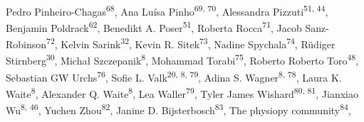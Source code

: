 \documentclass[10pt,a4paper,twocolumns]{proc}
\begin{document}
{Pedro Pinheiro-Chagas\textsuperscript{68}, %
Ana Luísa Pinho\textsuperscript{69, 70}, %
Alessandra Pizzuti\textsuperscript{51, 44}, %
Benjamin Poldrack\textsuperscript{62}, %
Benedikt A. Poser\textsuperscript{51}, %
Roberta Rocca\textsuperscript{71}, %
Jacob Sanz-Robinson\textsuperscript{72}, %
Kelvin Sarink\textsuperscript{32}, %
Kevin R. Sitek\textsuperscript{73}, %
Nadine Spychala\textsuperscript{74}, %
Rüdiger Stirnberg\textsuperscript{30}, %
Michał Szczepanik\textsuperscript{8}, %
Mohammad Torabi\textsuperscript{75}, %
Roberto Roberto Toro\textsuperscript{48}, %
Sebastian GW Urchs\textsuperscript{76}, %
Sofie L. Valk\textsuperscript{20, 8, 79}, %
Adina S. Wagner\textsuperscript{8, 78}, %
Laura K. Waite\textsuperscript{8}, %
Alexander Q. Waite\textsuperscript{8}, %
Lea Waller\textsuperscript{79}, %
Tyler James Wishard\textsuperscript{80, 81}, %
Jianxiao Wu\textsuperscript{8, 46}, %
Yuchen Zhou\textsuperscript{82}, %
Janine D. Bijsterbosch\textsuperscript{83}, %
The physiopy community\textsuperscript{84}, %
}
\\
\end{document}

